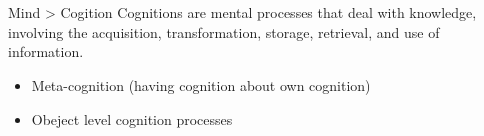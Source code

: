 \section{}
    \begin{frame}[allowframebreaks]{Mind > Cogition}
        Cognitions are mental processes that deal with knowledge, involving the acquisition, transformation, storage, retrieval, and use of information. \cite{revlin-2012-cognition-theory-and-practice}
        \begin{itemize}
            \item Meta-cognition (having cognition about own cognition)
            \item Obeject level cognition processes
        \end{itemize}
    \end{frame}
    
    \subsection{}
        
        